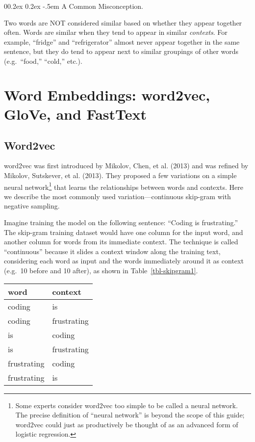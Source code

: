 \documentclass[
  man,
  floatsintext,
  longtable,
  nolmodern,
  notxfonts,
  notimes,
  colorlinks=true,linkcolor=blue,citecolor=blue,urlcolor=blue]{apa7}
\makeatletter
\renewcommand{\paragraph}{\@startsection{paragraph}{4}{\parindent}%
	{0\baselineskip \@plus 0.2ex \@minus 0.2ex}%
	{-.5em}%
	{\normalfont\normalsize\bfseries\typesectitle}}
\makeatother
\begin{document}
\paragraph{A Common Misconception.}\label{a-common-misconception}

Two words are NOT considered similar based on whether they appear
together often. Words are similar when they tend to appear in similar
\emph{contexts}. For example, ``fridge'' and ``refrigerator'' almost
never appear together in the same sentence, but they do tend to appear
next to similar groupings of other words (e.g.~``food,'' ``cold,''
etc.).

\section{Word Embeddings: word2vec, GloVe, and
FastText}\label{word-embeddings-word2vec-glove-and-fasttext}

\subsection{Word2vec}\label{word2vec}

word2vec was first introduced by Mikolov, Chen, et al. (2013) and was
refined by Mikolov, Sutskever, et al. (2013). They proposed a few
variations on a simple neural network\footnote{Some experts consider
  word2vec too simple to be called a neural network. The precise
  definition of ``neural network'' is beyond the scope of this guide;
  word2vec could just as productively be thought of as an advanced form
  of logistic regression.} that learns the relationships between words
and contexts. Here we describe the most commonly used
variation---continuous skip-gram with negative sampling.

Imagine training the model on the following sentence: ``Coding is
frustrating.'' The skip-gram training dataset would have one column for
the input word, and another column for words from its immediate context.
The technique is called ``continuous'' because it slides a context
window along the training text, considering each word as input and the
words immediately around it as context (e.g.~10 before and 10 after), as
shown in Table~\ref{tbl-skipgram1}.

\begin{table}

{\caption{{Example Skipgram Training Set}{\label{tbl-skipgram1}}}
\vspace{-20pt}}

\begin{longtable}[]{@{}ll@{}}
\toprule\noalign{}
word & context \\
\midrule\noalign{}
\endhead
\bottomrule\noalign{}
\endlastfoot
coding & is \\
coding & frustrating \\
is & coding \\
is & frustrating \\
frustrating & coding \\
frustrating & is \\
\end{longtable}

\end{table}
\end{document}
